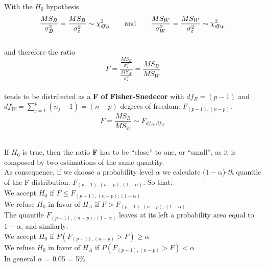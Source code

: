 \begin{frame}
  \vspace*{.25cm}
  With the $H_0$ hypothesis 
  $$ \frac{MS_B}{\sigma^2_B}=\frac{MS_B}{\sigma^2_{\varepsilon}}\sim\chi^2_{df_{B}}\mbox{\hspace*{.6cm} and \hspace*{.6cm}}\frac{MS_W}{\sigma^2_W}=\frac{MS_W}{\sigma^2_{\varepsilon}}\sim\chi^2_{df_{W}} $$\\
  \vspace*{.25cm}
  and therefore the ratio
  $$ F = \frac{\frac{MS_B}{\sigma^2_{\varepsilon}}}{\frac{MS_W}{\sigma^2_{\varepsilon}}} = \frac{MS_B}{MS_W} $$\\
  \vspace*{.25cm}
  tends to be distributed as a \textbf{F of Fisher-Snedecor} with {\boldmath$df_B=(p-1)$} and {\boldmath$df_W=\sum_{j=1}^p{(n_j-1)}=(n-p)$} degrees of freedom: {\boldmath$F_{(p-1),(n-p)}$}.
  $$ F = \frac{MS_B}{MS_W} \sim F_{{df_{B}},{df_{W}}} $$\\
\end{frame}

\begin{frame}
  \vspace*{.25cm}
  If {\boldmath$H_0$} is true, then the ratio \textbf{F} has to be ``close'' to one, or ``small'', as it is composed by two estimations of the same quantity.\\
  \vspace*{.25cm}
  As consequence, if we choose a probability level {\boldmath$\alpha$}  we calculate ($1-\alpha$)-\textit{th} quantile of the F distribution: {\boldmath$F_{(p-1),(n-p);(1-\alpha)}$}. So that: \\
  \vspace*{.15cm}
  \hspace{1cm} We accept {\boldmath$H_0$} if \hspace*{3cm}$F\leq F_{(p-1),(n-p);(1-\alpha)}$\\
  \vspace*{.15cm}
  \hspace{1cm} We refuse {\boldmath$H_0$} in favor of {\boldmath$H_A$} if \hspace*{0.4cm}$F> F_{(p-1),(n-p);(1-\alpha)}$\\
  \vspace*{.25cm}
  The quantile $ F_{(p-1),(n-p);(1-\alpha)} $ leaves at its left a probability area equal to {\boldmath$1-\alpha$}, and similarly: \\
  \vspace*{.15cm}
  \hspace{1cm} We accept {\boldmath$H_0$} if \hspace*{3cm}$P(F_{(p-1),(n-p)}>F) \geq \alpha $\\
  \vspace*{.15cm}
  \hspace{1cm} We refuse {\boldmath$H_0$} in favor of {\boldmath$H_A$} if \hspace*{0.4cm}$P(F_{(p-1),(n-p)}>F) < \alpha$ \\
  \vspace*{.25cm}
  In general {\boldmath $ \alpha $} = 0.05 = 5\%. \\
\end{frame}

